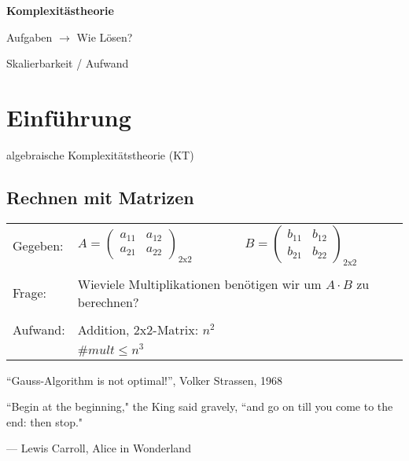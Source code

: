 \documentclass[
    final,
    a4paper,
    oneside,
    parskip=full,
    headings=standardclasses,
    headings=big,
    pointednumbers
]{scrartcl}
\newcommand{\mytitle}[1]{%
    {\LARGE \bfseries #1}
}
\begin{document}
    
    \mytitle{Komplexitästheorie}
    
    Aufgaben $\rightarrow$ Wie Lösen?
    
    Skalierbarkeit / Aufwand
    
    \section{Einführung}
    algebraische Komplexitätstheorie (KT)
    
    \subsection{Rechnen mit Matrizen}
    
    \begin{tabular}{lll}
        Gegeben: & $A = 
                   \begin{pmatrix}
                      a_{11} & a_{12} \\
                      a_{21} & a_{22}
                   \end{pmatrix}_{2\mathrm{x}2}$ &
                   $B =
                   \begin{pmatrix}
                   b_{11} & b_{12} \\
                   b_{21} & b_{22}
                   \end{pmatrix}_{2\mathrm{x}2}$ \\
                 & & \\
        Frage:   & \multicolumn{2}{l}{Wieviele Multiplikationen benötigen wir um $A \cdot B$ zu berechnen?} \\
                 & & \\
        Aufwand: & \multicolumn{2}{l}{Addition, $2\mathrm{x}2$-Matrix: $n^2$ } \\
                 & $\#mult \leq n^3$ &
    \end{tabular}

    \enquote{Gauss-Algorithm is not optimal!}, Volker Strassen, 1968
    
    \epigraph{``Begin at the beginning," the King said gravely, ``and go on till you
        come to the end: then stop."}{--- \textup{Lewis Carroll}, Alice in Wonderland}
    
    
\end{document}
